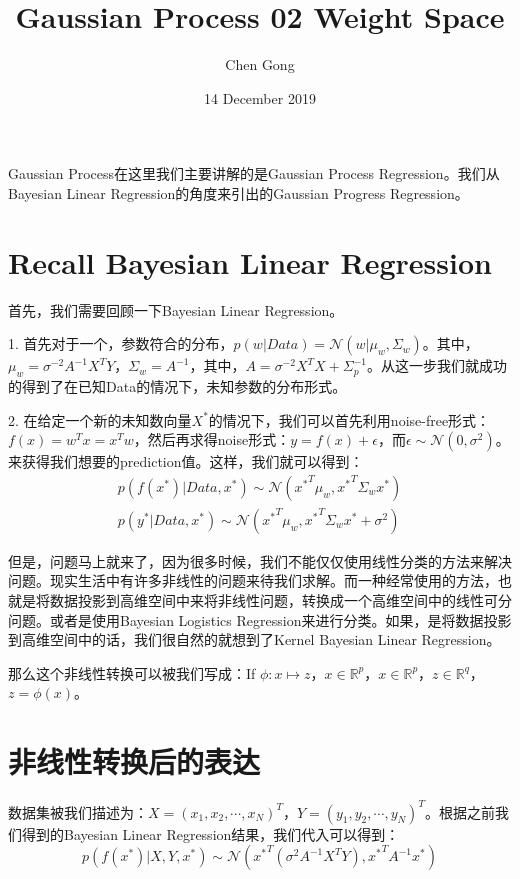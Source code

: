 \documentclass[a4paper]{article}
\title{Gaussian Process 02 Weight Space}
\author{Chen Gong}
\date{14 December 2019}
\begin{document}
\maketitle
Gaussian Process在这里我们主要讲解的是Gaussian Process Regression。我们从Bayesian Linear Regression的角度来引出的Gaussian Progress Regression。

\section{Recall Bayesian Linear Regression}
首先，我们需要回顾一下Bayesian Linear Regression。

1. 首先对于一个，参数符合的分布，$p(w|Data) = \mathcal{N}(w|\mu_w,\Sigma_w)$。其中，$\mu_w = \sigma^{-2}A^{-1}X^TY$，$\Sigma_w = A^{-1}$，其中，$A=\sigma^{-2}X^TX+\Sigma_p^{-1}$。从这一步我们就成功的得到了在已知Data的情况下，未知参数的分布形式。

2. 在给定一个新的未知数向量$X^\ast$的情况下，我们可以首先利用noise-free形式：$f(x) = w^Tx = x^Tw$，然后再求得noise形式：$y=f(x)+\epsilon$，而$\epsilon \sim \mathcal{N}(0,\sigma^2)$。来获得我们想要的prediction值。这样，我们就可以得到：
\begin{gather}
    p(f(x^\ast)|Data,x^\ast) \sim \mathcal{N}({x^\ast}^T\mu_w, {x^\ast}^T\Sigma_w{x^\ast}) \\
    p(y^\ast|Data,x^\ast) \sim \mathcal{N}({x^\ast}^T\mu_w, {x^\ast}^T\Sigma_w{x^\ast}+\sigma^2)
\end{gather}

但是，问题马上就来了，因为很多时候，我们不能仅仅使用线性分类的方法来解决问题。现实生活中有许多非线性的问题来待我们求解。而一种经常使用的方法，也就是将数据投影到高维空间中来将非线性问题，转换成一个高维空间中的线性可分问题。或者是使用Bayesian Logistics Regression来进行分类。如果，是将数据投影到高维空间中的话，我们很自然的就想到了Kernel Bayesian Linear Regression。

那么这个非线性转换可以被我们写成：If $\phi:x\mapsto z$，$x\in \mathbb{R}^p$，$x\in\mathbb{R}^p$，$z\in\mathbb{R}^q$，$z=\phi(x)$。

\section{非线性转换后的表达}
数据集被我们描述为：$X = (x_1,x_2,\cdots,x_N)^T$，$Y = (y_1,y_2,\cdots,y_N)^T$。根据之前我们得到的Bayesian Linear Regression结果，我们代入可以得到：
\begin{equation}
    p(f(x^\ast)|X,Y,x^\ast) \sim \mathcal{N}({x^\ast}^T(\sigma^{2}A^{-1}X^TY),{x^\ast}^TA^{-1}x^\ast)
\end{equation}
\end{document}
